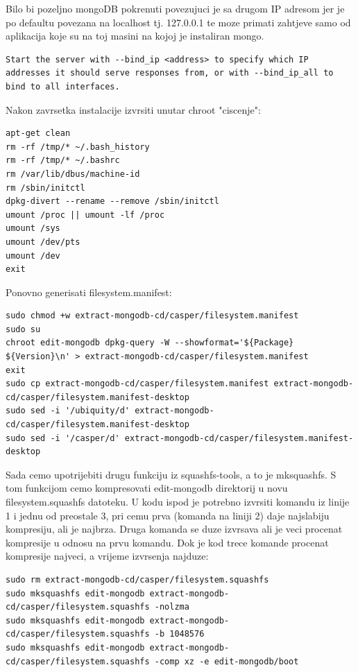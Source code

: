 \documentclass[12pt,vi]{mitthesis}
\begin{document}
Bilo bi pozeljno mongoDB pokrenuti povezujuci je sa drugom IP adresom jer je po defaultu povezana na localhost tj. 127.0.0.1 te moze primati zahtjeve samo od aplikacija koje su na toj masini na kojoj je instaliran mongo.
\begin{lstlisting}[style=BashInputStyle]
Start the server with --bind_ip <address> to specify which IP addresses it should serve responses from, or with --bind_ip_all to bind to all interfaces.
\end{lstlisting}
\noindent
Nakon zavrsetka instalacije izvrsiti unutar chroot "ciscenje":
\begin{lstlisting}[style=BashInputStyle]
apt-get clean
rm -rf /tmp/* ~/.bash_history
rm -rf /tmp/* ~/.bashrc
rm /var/lib/dbus/machine-id
rm /sbin/initctl
dpkg-divert --rename --remove /sbin/initctl
umount /proc || umount -lf /proc
umount /sys
umount /dev/pts
umount /dev
exit
\end{lstlisting}

\noindent
Ponovno generisati filesystem.manifest:
\begin{lstlisting}[style=BashInputStyle]
sudo chmod +w extract-mongodb-cd/casper/filesystem.manifest
sudo su
chroot edit-mongodb dpkg-query -W --showformat='${Package} ${Version}\n' > extract-mongodb-cd/casper/filesystem.manifest
exit
sudo cp extract-mongodb-cd/casper/filesystem.manifest extract-mongodb-cd/casper/filesystem.manifest-desktop
sudo sed -i '/ubiquity/d' extract-mongodb-cd/casper/filesystem.manifest-desktop
sudo sed -i '/casper/d' extract-mongodb-cd/casper/filesystem.manifest-desktop
\end{lstlisting}

\noindent
Sada cemo upotrijebiti drugu funkciju iz squashfs-tools, a to je mksquashfs. S tom funkcijom cemo kompresovati edit-mongodb direktorij u novu filesystem.squashfs datoteku. U kodu ispod je potrebno izvrsiti komandu iz linije 1 i jednu od preostale 3, pri cemu prva (komanda na liniji 2) daje najslabiju kompresiju, ali je najbrza. Druga komanda se duze izvrsava ali je veci procenat kompresije u odnosu na prvu komandu. Dok je kod trece komande procenat kompresije najveci, a vrijeme izvrsenja najduze:
\begin{lstlisting}[style=BashInputStyle]
sudo rm extract-mongodb-cd/casper/filesystem.squashfs
sudo mksquashfs edit-mongodb extract-mongodb-cd/casper/filesystem.squashfs -nolzma 
sudo mksquashfs edit-mongodb extract-mongodb-cd/casper/filesystem.squashfs -b 1048576
sudo mksquashfs edit-mongodb extract-mongodb-cd/casper/filesystem.squashfs -comp xz -e edit-mongodb/boot
\end{lstlisting}
\end{document}
